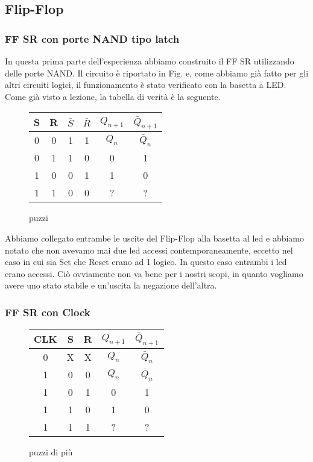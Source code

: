 \subsection{Flip-Flop}

\subsubsection*{FF SR con porte NAND tipo latch}


In questa prima parte dell'esperienza abbiamo construito il FF SR utilizzando delle porte NAND. Il circuito è riportato in Fig. e, come abbiamo già fatto per gli altri circuiti logici, il funzionamento è stato verificato con la basetta a LED. Come già visto a lezione, la tabella di verità è la seguente. 

\begin{figure}[H]
		\centering
		{\renewcommand{\arraystretch}{1.1}%
		\begin{tabular}{c|c|c|c|c|c}
		
		S & R & $\bar S$ & $\bar R$ & $Q_{n+1}$ & $\bar Q_{n+1}$ \\
		\hline
		0 & 0 & 1 & 1 & $Q_n$ & $\bar Q_n$\\
		\hline
		0 & 1 & 1 & 0 & 0 &1\\
		\hline
		1 & 0 & 0 & 1& 1 & 0\\
		\hline
		1 & 1 &0 &0 & ? & ?\\
		\end{tabular}}
		\label{tab11:FFSR}
		\caption{puzzi}
        \end{figure}


Abbiamo collegato entrambe le uscite del Flip-Flop alla basetta al led e abbiamo notato che non avevamo mai due led accessi contemporaneamente, eccetto nel caso in cui sia Set che Reset erano ad 1 logico. In questo caso entrambi i led erano accessi. Ciò ovviamente non va bene per i nostri scopi, in quanto vogliamo avere uno stato stabile e un'uscita la negazione dell'altra. 


\subsubsection*{FF SR con Clock}






\begin{figure}[H]
		\centering
		{\renewcommand{\arraystretch}{1.1}%
		\begin{tabular}{c|c|c|c|c}
		CLK & S & R & $Q_{n+1}$ & $\bar Q_{n+1}$  \\
		\hline		
		0 & X & X & $Q_n$ & $\bar Q_n$\\
		\hline
		 1&0 & 0 & $Q_n$ & $\bar Q_n$\\
		\hline
		1&0 & 1 & 0 &1\\
		\hline
		1&1 & 0 & 1 & 0\\
		\hline
		1&1 & 1 & ? & ?\\
		\end{tabular}}
		\label{tab11:FFSR}
		\caption{puzzi di più}
        \end{figure}


